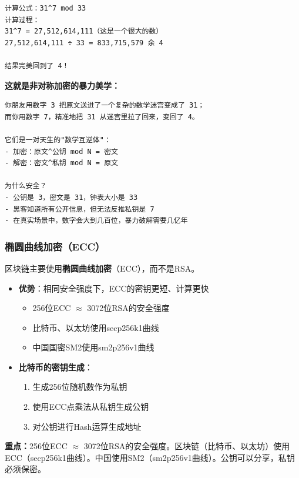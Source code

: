 ﻿\documentclass[12pt,a4paper]{article}
\begin{document}
\begin{examplebox}
\begin{lstlisting}
计算公式：31^7 mod 33
计算过程：
31^7 = 27,512,614,111（这是一个很大的数）
27,512,614,111 ÷ 33 = 833,715,579 余 4

结果完美回到了 4！
\end{lstlisting}

\textbf{这就是非对称加密的暴力美学：}

\begin{lstlisting}
你朋友用数字 3 把原文送进了一个复杂的数学迷宫变成了 31；
而你用数字 7，精准地把 31 从迷宫里拉了回来，变回了 4。

它们是一对天生的"数学互逆体"：
- 加密：原文^公钥 mod N = 密文
- 解密：密文^私钥 mod N = 原文

为什么安全？
- 公钥是 3，密文是 31，钟表大小是 33
- 黑客知道所有公开信息，但无法反推私钥是 7
- 在真实场景中，数字会大到几百位，暴力破解需要几亿年
\end{lstlisting}
\end{examplebox}

\subsubsection{椭圆曲线加密（ECC）}

区块链主要使用\textbf{椭圆曲线加密}（ECC），而不是RSA。

\begin{itemize}[leftmargin=1.5em]
\item \textbf{优势}：相同安全强度下，ECC的密钥更短、计算更快
  \begin{itemize}
  \item 256位ECC $\approx$ 3072位RSA的安全强度
  \item 比特币、以太坊使用secp256k1曲线
  \item 中国国密SM2使用sm2p256v1曲线
  \end{itemize}
\item \textbf{比特币的密钥生成}：
  \begin{enumerate}
  \item 生成256位随机数作为私钥
  \item 使用ECC点乘法从私钥生成公钥
  \item 对公钥进行Hash运算生成地址
  \end{enumerate}
\end{itemize}

\begin{keypointbox}
\textbf{重点：}256位ECC $\approx$ 3072位RSA的安全强度。区块链（比特币、以太坊）使用ECC（secp256k1曲线）。中国使用SM2（sm2p256v1曲线）。公钥可以分享，私钥必须保密。
\end{keypointbox}
\end{document}
